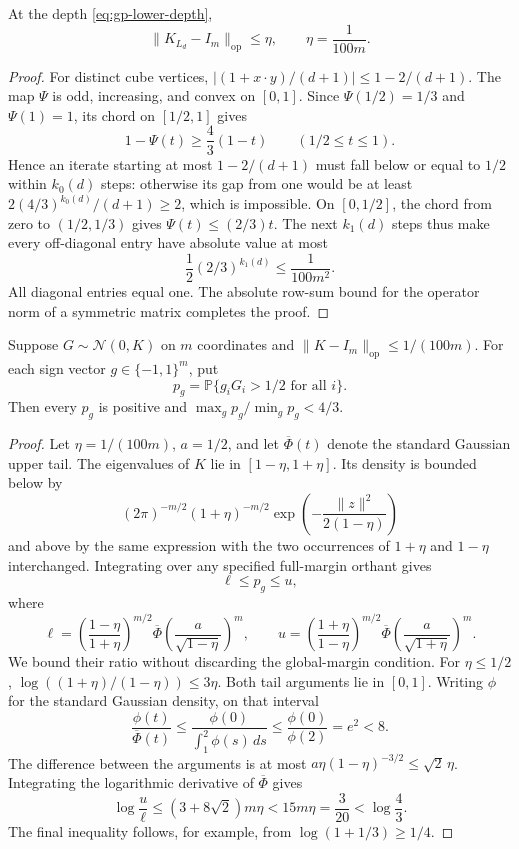 \begin{lemma}
\label{lem:gp-lower-white}
At the depth \eqref{eq:gp-lower-depth},
\[
 \|K_{L_d}-I_m\|_{\mathrm{op}}\le\eta,\qquad
 \eta=\frac1{100m}.
\]
\end{lemma}
\begin{proof}
For distinct cube vertices,
$|(1+x\cdot y)/(d+1)|\le1-2/(d+1)$.
The map $\Psi$ is odd, increasing, and convex on $[0,1]$.
Since $\Psi(1/2)=1/3$ and $\Psi(1)=1$, its chord on $[1/2,1]$ gives
\[
 1-\Psi(t)\ge\frac43(1-t)\qquad(1/2\le t\le1).
\]
Hence an iterate starting at most $1-2/(d+1)$ must fall below or equal
to $1/2$ within $k_0(d)$ steps: otherwise its gap from one would
be at least $2(4/3)^{k_0(d)}/(d+1)\ge2$, which is impossible.
On $[0,1/2]$, the chord from zero to $(1/2,1/3)$ gives
$\Psi(t)\le(2/3)t$. The next $k_1(d)$ steps thus make every
off-diagonal entry have absolute value at most
\[
 \frac12(2/3)^{k_1(d)}\le\frac1{100m^2}.
\]
All diagonal entries equal one. The absolute row-sum bound for the
operator norm of a symmetric matrix completes the proof.
\end{proof}

\begin{lemma}
\label{lem:gp-lower-orthants}
Suppose $G\sim\mathcal N(0,K)$ on $m$ coordinates and
$\|K-I_m\|_{\mathrm{op}}\le1/(100m)$. For each sign vector
$g\in\{-1,1\}^m$, put
\[
 p_g=\mathbb P\{g_iG_i>1/2\text{ for all }i\}.
\]
Then every $p_g$ is positive and
$\max_g p_g/\min_g p_g<4/3$.
\end{lemma}
\begin{proof}
Let $\eta=1/(100m)$, $a=1/2$, and let
$\overline\Phi(t)$ denote the standard Gaussian upper tail.
The eigenvalues of $K$ lie in $[1-\eta,1+\eta]$.
Its density is bounded below by
\[
 (2\pi)^{-m/2}(1+\eta)^{-m/2}
 \exp\left(-\frac{\|z\|^2}{2(1-\eta)}\right)
\]
and above by the same expression with the two occurrences of
$1+\eta$ and $1-\eta$ interchanged.
Integrating over any specified full-margin orthant gives
\[
 \ell\le p_g\le u,
\]
where
\[
 \ell=\left(\frac{1-\eta}{1+\eta}\right)^{m/2}
       \overline\Phi\left(\frac a{\sqrt{1-\eta}}\right)^m,
 \qquad
 u=\left(\frac{1+\eta}{1-\eta}\right)^{m/2}
       \overline\Phi\left(\frac a{\sqrt{1+\eta}}\right)^m.
\]
We bound their ratio without discarding the global-margin condition.
For $\eta\le1/2$,
$\log((1+\eta)/(1-\eta))\le3\eta$.
Both tail arguments lie in $[0,1]$. Writing $\phi$ for the standard
Gaussian density, on that interval
\[
 \frac{\phi(t)}{\overline\Phi(t)}
 \le\frac{\phi(0)}{\int_1^2\phi(s)\,ds}
 \le\frac{\phi(0)}{\phi(2)}=e^2<8.
\]
The difference between the arguments is at most
$a\eta(1-\eta)^{-3/2}\le\sqrt2\,\eta$.
Integrating the logarithmic derivative of $\overline\Phi$ gives
\[
 \log\frac u\ell
 \le (3+8\sqrt2)m\eta<15m\eta=\frac3{20}
 <\log\frac43.
\]
The final inequality follows, for example, from
$\log(1+1/3)\ge1/4$.
\end{proof}

